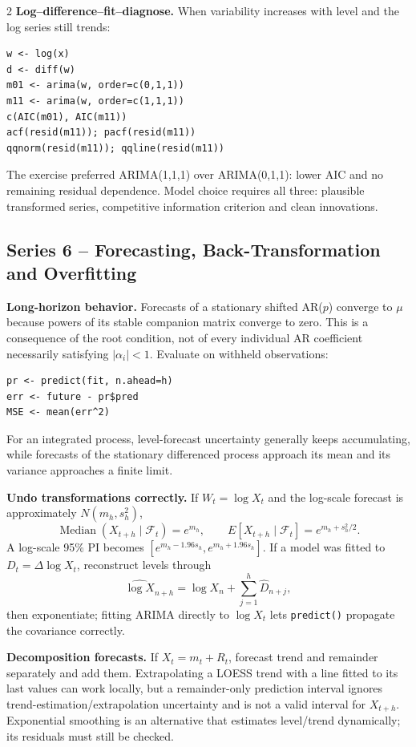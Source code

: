 \documentclass[9pt,a4paper]{extarticle}
\newcommand{\key}[1]{\textbf{#1}}
\begin{document}
\begin{multicols}{2}
\key{Log--difference--fit--diagnose.} When variability increases with level and the log series still trends:
{\scriptsize
\begin{verbatim}
w <- log(x)
d <- diff(w)
m01 <- arima(w, order=c(0,1,1))
m11 <- arima(w, order=c(1,1,1))
c(AIC(m01), AIC(m11))
acf(resid(m11)); pacf(resid(m11))
qqnorm(resid(m11)); qqline(resid(m11))
\end{verbatim}}
The exercise preferred ARIMA(1,1,1) over ARIMA(0,1,1): lower AIC and no remaining residual dependence. Model choice requires all three: plausible transformed series, competitive information criterion and clean innovations.

\subsection*{Series 6 -- Forecasting, Back-Transformation and Overfitting}

\key{Long-horizon behavior.} Forecasts of a stationary shifted AR(\(p\)) converge to \(\mu\) because powers of its stable companion matrix converge to zero. This is a consequence of the root condition, not of every individual AR coefficient necessarily satisfying \(|\alpha_i|<1\). Evaluate on withheld observations:
{\scriptsize
\begin{verbatim}
pr <- predict(fit, n.ahead=h)
err <- future - pr$pred
MSE <- mean(err^2)
\end{verbatim}}

For an integrated process, level-forecast uncertainty generally keeps accumulating, while forecasts of the stationary differenced process approach its mean and its variance approaches a finite limit.

\key{Undo transformations correctly.} If \(W_t=\log X_t\) and the log-scale forecast is approximately \(N(m_h,s_h^2)\),
\[
\operatorname{Median}(X_{t+h}\mid\mathcal F_t)=e^{m_h},\qquad
E[X_{t+h}\mid\mathcal F_t]=e^{m_h+s_h^2/2}.
\]
A log-scale 95\% PI becomes \([e^{m_h-1.96s_h},e^{m_h+1.96s_h}]\). If a model was fitted to \(D_t=\Delta\log X_t\), reconstruct levels through
\[
\widehat{\log X}_{n+h}=\log X_n+\sum_{j=1}^h\widehat D_{n+j},
\]
then exponentiate; fitting ARIMA directly to \(\log X_t\) lets \texttt{predict()} propagate the covariance correctly.

\key{Decomposition forecasts.} If \(X_t=m_t+R_t\), forecast trend and remainder separately and add them. Extrapolating a LOESS trend with a line fitted to its last values can work locally, but a remainder-only prediction interval ignores trend-estimation/extrapolation uncertainty and is not a valid interval for \(X_{t+h}\). Exponential smoothing is an alternative that estimates level/trend dynamically; its residuals must still be checked.


\end{multicols}
\end{document}
